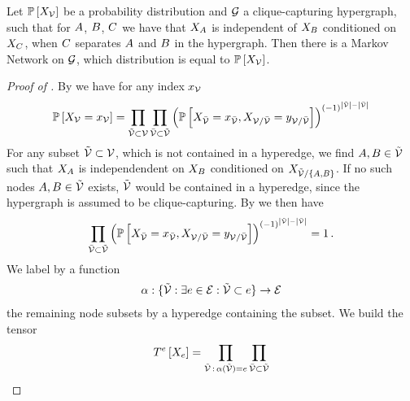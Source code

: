 \begin{theorem}
	Let $\mathbb{P}\left[X_{\mathcal{V}}\right]$ be a probability distribution and $\mathcal{G}$ a clique-capturing hypergraph, such that for $A$, $B$, $C$ we have that $X_{A}$ is independent of $X_{B}$ conditioned on $X_{C}$, when $C$ separates $A$ and $B$ in the hypergraph.
	Then there is a Markov Network on $\mathcal{G}$, which distribution is equal to $\mathbb{P}\left[X_{\mathcal{V}}\right]$.
\end{theorem}
\begin{proof}[Proof of ]
	By  we have for any index $x_{\mathcal{V}}$
	\begin{align*}
		\mathbb{P}\left[X_{\mathcal{V}}=x_{\mathcal{V}}\right] = 
		\prod_{\tilde{\mathcal{V}}\subset\mathcal{V}} \prod_{\bar{\mathcal{V}}\subset\tilde{\mathcal{V}}} 
		\left(
			\mathbb{P}\left[X_{\bar{\mathcal{V}}}=x_{\bar{\mathcal{V}}},X_{\mathcal{V}/\bar{\mathcal{V}}}=y_{\mathcal{V}/\bar{\mathcal{V}}}\right]
		\right)^{(-1)^{\left|\tilde{\mathcal{V}}\right|-\left|\bar{\mathcal{V}}\right|}}
	\end{align*}
	For any subset $\tilde{\mathcal{V}}\subset\mathcal{V}$, which is not contained in a hyperedge, we find $A,B \in\tilde{\mathcal{V}}$ such that $X_{A}$ is independendent on $X_{B}$ conditioned on $X_{\tilde{\mathcal{V}}/\{A,B\}}$.
	If no such nodes $A,B \in\tilde{\mathcal{V}}$ exists, $\tilde{\mathcal{V}}$ would be contained in a hyperedge, since the hypergraph is assumed to be clique-capturing.
	By  we then have
	\begin{align*}
	 \prod_{\bar{\mathcal{V}}\subset\tilde{\mathcal{V}}} 
		\left(
			\mathbb{P}\left[X_{\bar{\mathcal{V}}}=x_{\bar{\mathcal{V}}},X_{\mathcal{V}/\bar{\mathcal{V}}}=y_{\mathcal{V}/\bar{\mathcal{V}}}\right]
		\right)^{(-1)^{\left|\tilde{\mathcal{V}}\right|-\left|\bar{\mathcal{V}}\right|}} = 1 \, .
	\end{align*}
	We label by a function 
	\begin{align*}
		\alpha: \{\tilde{\mathcal{V}} : \exists e\in\mathcal{E}: \tilde{\mathcal{V}} \subset e \} \rightarrow \mathcal{E}
	\end{align*}	
	the remaining node subsets by a hyperedge containing the subset.
	We build the tensor
	\begin{align*}
		\hypercoreofat{\edge}{\catvariableof{\edge}} = \prod_{\secnodes \, : \, \alpha(\secnodes) = \edge} \prod_{\thirdnodes\subset\secnodes} 

\end{align*}
\end{proof}
